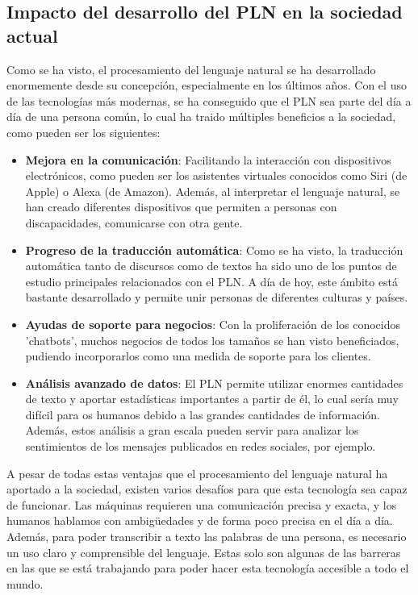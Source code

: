 \subsection{Impacto del desarrollo del PLN en la sociedad actual}

Como se ha visto, el procesamiento del lenguaje natural se ha desarrollado enormemente desde su concepción, especialmente en los últimos años. Con el uso de las tecnologías más modernas, se ha conseguido que el PLN sea parte del día a día de una persona común, lo cual ha traido múltiples beneficios a la sociedad, como pueden ser los siguientes:

\begin{itemize}
	\item \textbf{Mejora en la comunicación}: Facilitando la interacción con dispositivos electrónicos, como pueden ser los asistentes virtuales conocidos como Siri (de Apple) o Alexa (de Amazon). Además, al interpretar el lenguaje natural, se han creado diferentes dispositivos que permiten a personas con discapacidades, comunicarse con otra gente.
	
	\item \textbf{Progreso de la traducción automática}: Como se ha visto, la traducción automática tanto de discursos como de textos ha sido uno de los puntos de estudio principales relacionados con el PLN. A día de hoy, este ámbito está bastante desarrollado y permite unir personas de diferentes culturas y países.
	
	\item \textbf{Ayudas de soporte para negocios}: Con la proliferación de los conocidos 'chatbots', muchos negocios de todos los tamaños se han visto beneficiados, pudiendo incorporarlos como una medida de soporte para los clientes.
	
	\item \textbf{Análisis avanzado de datos}: El PLN permite utilizar enormes cantidades de texto y aportar estadísticas importantes a partir de él, lo cual sería muy difícil para os humanos debido a las grandes cantidades de información. Además, estos análisis a gran escala pueden servir para analizar los sentimientos de los mensajes publicados en redes sociales, por ejemplo.
\end{itemize}

A pesar de todas estas ventajas que el procesamiento del lenguaje natural ha aportado a la sociedad, existen varios desafíos para que esta tecnología sea capaz de funcionar. Las máquinas requieren una comunicación precisa y exacta, y los humanos hablamos con ambigüedades y de forma poco precisa en el día a día. Además, para poder transcribir a texto las palabras de una persona, es necesario un uso claro y comprensible del lenguaje. Estas solo son algunas de las barreras en las que se está trabajando para poder hacer esta tecnología accesible a todo el mundo.


